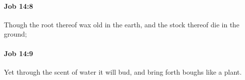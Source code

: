 		\paragraph{Job 14:8} %
			\label{JOB-14-8}

			Though the root thereof wax old in the earth, and the stock thereof die in the ground;


		\paragraph{Job 14:9} %
			\label{JOB-14-9}

			Yet through the scent of water it will bud, and bring forth boughs like a plant.


